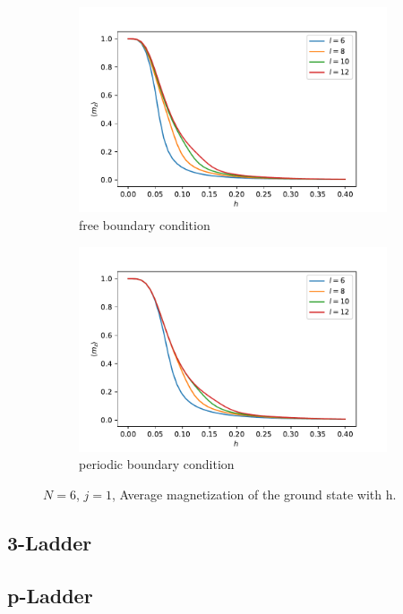 \documentclass[a4paper]{extarticle}
\begin{document}
\begin{figure}[h!]
  \begin{subfigure}[h]{0.95\textwidth}
        \includegraphics[height=.73\linewidth]{../plots/pl_mz_fbc_2}
        \caption{free boundary condition}
        \label{fig:fbc}
    \end{subfigure}
  \begin{subfigure}[h]{0.95\textwidth}
        \includegraphics[height=.73\linewidth]{../plots/pl_mz_2}
        \caption{periodic boundary condition}
        \label{fig:pbc}
    \end{subfigure}
    \caption[Average magnetization of the ground state with h.]{$N=6$, $j=1$, Average magnetization of the ground state with h.}
    \label{fig:mzvsh}
\end{figure}

\clearpage

\subsection{3-Ladder}
\subsection{p-Ladder}
\end{document}
